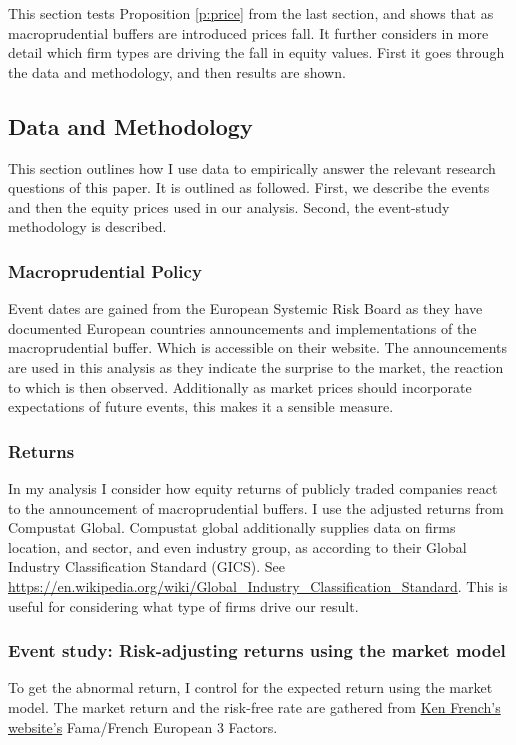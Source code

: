 \documentclass[11pt]{article}
\begin{document}
This section tests Proposition \ref{p:price} from the last section, and shows that as macroprudential buffers are introduced prices fall. It further considers in more detail which firm types are driving the fall in equity values. First it goes through the data and methodology, %
and then results are shown.

\subsection{Data and Methodology}

This section outlines how I use data to empirically answer the relevant research questions of this paper. It is outlined as followed. First, we describe the events and then the equity prices used in our analysis. Second, the event-study methodology is described.

\subsubsection*{Macroprudential Policy}
Event dates are gained from the European Systemic Risk Board as they have documented European countries announcements and implementations of the macroprudential buffer. Which is accessible on their website. The announcements are used in this analysis as they indicate the surprise to the market, the reaction to which is then observed. Additionally as market prices should incorporate expectations of future events, this makes it a sensible measure.

\subsubsection*{Returns}

In my analysis I consider how equity returns of publicly traded companies react to the announcement of macroprudential buffers. I use the adjusted returns from Compustat Global. Compustat global additionally supplies data on firms location, and sector, and even industry group, as according to their Global Industry Classification Standard (GICS). See \url{https://en.wikipedia.org/wiki/Global_Industry_Classification_Standard}. This is useful for considering what type of firms drive our result.

\subsubsection*{Event study: Risk-adjusting returns using the market model} \label{sec:eventstudymethod}
To get the abnormal return, I control for the expected return using the market model. The market return and the risk-free rate are gathered from \href{https://mba.tuck.dartmouth.edu/pages/faculty/ken.french/data_library.html}{Ken French's website's} Fama/French European 3 Factors.
\end{document}
